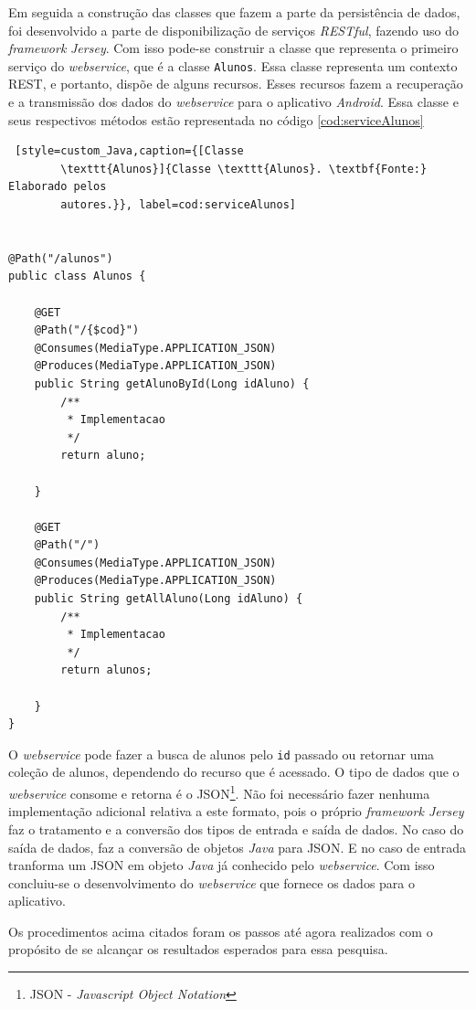 	\par Em seguida a construção das classes que fazem a parte da persistência de
dados, foi desenvolvido a parte de disponibilização de serviços
\textit{RESTful}, fazendo uso do \textit{framework} \textit{Jersey}. Com isso
pode-se construir a classe que representa o primeiro serviço do
\textit{webservice}, que é a classe \texttt{Alunos}. Essa classe representa um
contexto REST, e portanto, dispõe de alguns recursos. Esses recursos fazem a
recuperação e a transmissão dos dados do \textit{webservice} para o aplicativo
\textit{Android}. Essa classe e seus respectivos métodos  estão representada no
código \ref{cod:serviceAlunos}

		\begin{lstlisting} [style=custom_Java,caption={[Classe
		\texttt{Alunos}]{Classe \texttt{Alunos}. \textbf{Fonte:} Elaborado pelos
		autores.}}, label=cod:serviceAlunos] 


@Path("/alunos")
public class Alunos {

	@GET
	@Path("/{$cod}")
	@Consumes(MediaType.APPLICATION_JSON)
	@Produces(MediaType.APPLICATION_JSON)
	public String getAlunoById(Long idAluno) {
		/**
		 * Implementacao
		 */
		return aluno;

	}
	
	@GET
	@Path("/")
	@Consumes(MediaType.APPLICATION_JSON)
	@Produces(MediaType.APPLICATION_JSON)
	public String getAllAluno(Long idAluno) {
		/**
		 * Implementacao
		 */
		return alunos;

	}
}
	\end{lstlisting} 
		
		\par O \textit{webservice} pode fazer a busca de alunos pelo \texttt{id}
passado ou retornar uma coleção de alunos, dependendo do recurso que é
acessado. O tipo de dados que o \textit{webservice} consome e retorna é o
JSON\footnote{JSON - \textit{Javascript Object Notation}}. Não foi necessário
fazer nenhuma implementação adicional relativa a este formato, pois o próprio
\textit{framework Jersey} faz o tratamento e a conversão dos tipos de entrada e
saída de dados. No caso do saída de dados, faz a conversão de objetos 
\textit{Java} para JSON. E no caso de entrada tranforma um JSON em objeto
\textit{Java} já conhecido pelo \textit{webservice}. Com isso concluiu-se o
desenvolvimento do \textit{webservice} que fornece os dados para o aplicativo.

	\par Os procedimentos acima citados foram os passos até agora realizados com o
propósito de se alcançar os resultados esperados para essa pesquisa.
		
